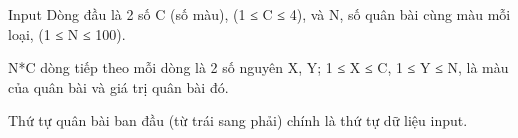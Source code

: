 Input
Dòng đầu là 2 số C (số màu), (1 ≤ C ≤ 4), và N, số quân bài cùng màu mỗi loại, (1 ≤ N ≤ 100).  

   N*C dòng tiếp theo mỗi dòng là 2 số nguyên X, Y; 1 ≤ X ≤ C, 1 ≤ Y ≤ N,  là màu của quân bài và giá trị quân bài đó.  

   Thứ tự quân bài ban đầu (từ trái sang phải) chính là thứ tự dữ liệu input.